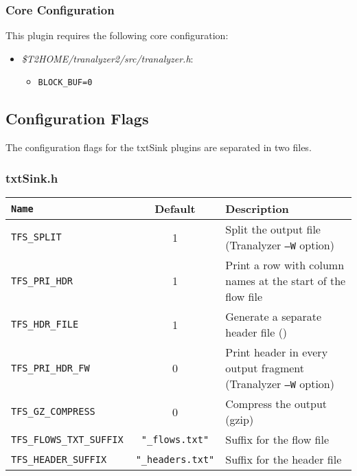 \documentclass[documentation]{subfiles}
\begin{document}
\subsubsection{Core Configuration}
This plugin requires the following core configuration:
\begin{itemize}
    \item {\em \$T2HOME/tranalyzer2/src/tranalyzer.h}:
        \begin{itemize}
            \item {\tt BLOCK\_BUF=0}
        \end{itemize}
\end{itemize}

\subsection{Configuration Flags}
The configuration flags for the txtSink plugins are separated in two files.

\subsubsection{txtSink.h}
\begin{longtable}{>{\tt}lcl}
    \toprule
    {\bf Name}              & {\bf Default}               & {\bf Description}\\
    \midrule\endhead%
    TFS\_SPLIT              & 1                           & Split the output file (Tranalyzer {\tt --W} option)\\
    TFS\_PRI\_HDR           & 1                           & Print a row with column names at the start of the flow file\\
    TFS\_HDR\_FILE          & 1                           & Generate a separate header file ({s:tfsHeader})\\
    TFS\_PRI\_HDR\_FW       & 0                           & Print header in every output fragment (Tranalyzer {\tt --W} option)\\
    TFS\_GZ\_COMPRESS       & 0                           & Compress the output (gzip)\\
    TFS\_FLOWS\_TXT\_SUFFIX & {\small\tt "\_flows.txt"}   & Suffix for the flow file\\
    TFS\_HEADER\_SUFFIX     & {\small\tt "\_headers.txt"} & Suffix for the header file\\
    \bottomrule
\end{longtable}
\end{document}
